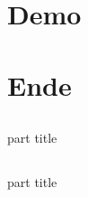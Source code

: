 \documentclass[11pt]{beamer}
\begin{document}
\section{Demo}

\AtBeginSection{}
\section*{Ende}

\subsection*{}
\begin{frame}
  \begin{centering}
    \begin{beamercolorbox}[sep=12pt,center]{part title}
      \par
    \end{beamercolorbox}
  \end{centering}
\end{frame}
\subsection*{}
\begin{frame}
  \begin{centering}
    \begin{beamercolorbox}[sep=12pt,center]{part title}
      \par
    \end{beamercolorbox}
  \end{centering}
\end{frame}
\end{document}
